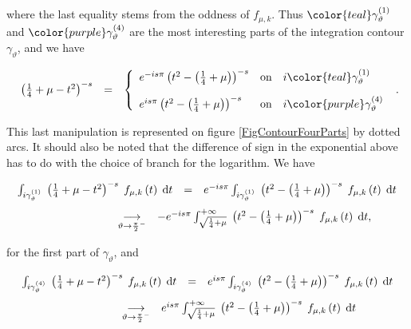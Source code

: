 \documentclass{jams-l}
\theoremstyle{definition}
\theoremstyle{remark}
\numberwithin{equation}{section}
\begin{document}
        \noindent where the last equality stems from the oddness of $f_{\mu,k}$. Thus $\color{teal} \gamma_{\vartheta}^{\left( 1 \right)}$ and $\color{purple} \gamma_{\vartheta}^{\left( 4 \right)}$ are the most interesting parts of the integration contour $\gamma_{\vartheta}$, and we have
        
        \[ \begin{array}{lll}
                \left( \frac{1}{4} + \mu - t^2 \right)^{-s} & = & \left \{ \begin{array}{lcl} e^{-is\pi} \left( t^2 - \left( \frac{1}{4} + \mu \right) \right)^{-s} & \text{on} & i\color{teal} \gamma_{\vartheta}^{\left( 1 \right)} \\[1em] e^{is\pi} \left( t^2 - \left( \frac{1}{4} + \mu \right) \right)^{-s} & \text{on} & i\color{purple} \gamma_{\vartheta}^{\left( 4 \right)} \end{array} \right.
            \end{array} . \]
        
        \noindent This last manipulation is represented on figure \ref{FigContourFourParts} by dotted arcs. It should also be noted that the difference of sign in the exponential above has to do with the choice of branch for the logarithm. We have
        
        \[ \begin{array}{lllll}
                \multicolumn{3}{l}{\int_{i \gamma_{\vartheta}^{\left( 1 \right)}} \; \left( \frac{1}{4} + \mu - t^2 \right)^{-s} \; f_{\mu,k} \left( t \right) \; \text{d}t} & = & e^{-is\pi} \int_{i \gamma_{\vartheta}^{\left( 1 \right)}} \; \left( t^2 - \left( \frac{1}{4} + \mu \right) \right)^{-s} \; f_{\mu,k} \left( t \right) \; \text{d}t \\[1em]
                
                \qquad \qquad \qquad \qquad & \underset{\vartheta \rightarrow \frac{\pi}{2}^{-}}{\longrightarrow} & \multicolumn{3}{l}{- e^{-is\pi} \int_{\sqrt{\frac{1}{4}+\mu}}^{+\infty} \; \left( t^2 - \left( \frac{1}{4} + \mu \right) \right)^{-s} \; f_{\mu,k} \left( t \right) \; \text{d}t,}
            \end{array} \]
        
        \noindent for the first part of $\gamma_{\vartheta}$, and
        
        \[ \begin{array}{lllll}
                \multicolumn{3}{l}{\int_{i \gamma_{\vartheta}^{\left( 4 \right)}} \; \left( \frac{1}{4} + \mu - t^2 \right)^{-s} \; f_{\mu,k} \left( t \right) \; \text{d}t} & = & e^{is\pi} \int_{i \gamma_{\vartheta}^{\left( 4 \right)}} \; \left( t^2 - \left( \frac{1}{4} + \mu \right) \right)^{-s} \; f_{\mu,k} \left( t \right) \; \text{d}t \\[1em]
                
                \qquad \qquad \qquad \qquad & \underset{\vartheta \rightarrow \frac{\pi}{2}^{-}}{\longrightarrow} & \multicolumn{3}{l}{e^{is\pi} \int_{\sqrt{\frac{1}{4}+\mu}}^{+\infty} \; \left( t^2 - \left( \frac{1}{4} + \mu \right) \right)^{-s} \; f_{\mu,k} \left( t \right) \; \text{d}t}
            \end{array} \]
        
\end{document}
